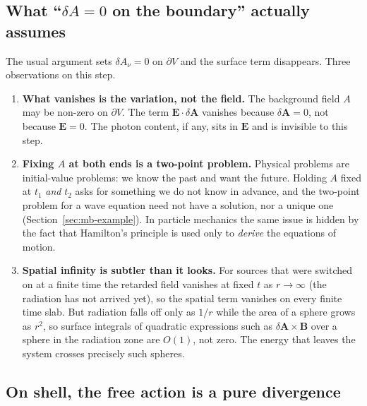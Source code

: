 \subsection{What ``$\delta A=0$ on the boundary'' actually assumes}

The usual argument sets $\delta A_\nu=0$ on $\partial V$ and the surface
term disappears. Three observations on this step.

\begin{enumerate}
\item \textbf{What vanishes is the variation, not the field.} The
background field $A$ may be non-zero on $\partial V$. The term
$\mathbf E\cdot\delta\mathbf A$ vanishes because $\delta\mathbf A=0$, not
because $\mathbf E=0$. The photon content, if any, sits in $\mathbf E$ and
is invisible to this step.

\item \textbf{Fixing $A$ at both ends is a two-point problem.} Physical
problems are initial-value problems: we know the past and want the future.
Holding $A$ fixed at $t_1$ \emph{and} $t_2$ asks for something we do not
know in advance, and the two-point problem for a wave equation need not
have a solution, nor a unique one (Section~\ref{sec:mb-example}). In
particle mechanics the same issue is hidden by the fact that Hamilton's
principle is used only to \emph{derive} the equations of motion.

\item \textbf{Spatial infinity is subtler than it looks.} For sources that
were switched on at a finite time the retarded field vanishes at fixed $t$
as $r\to\infty$ (the radiation has not arrived yet), so the spatial term
vanishes on every finite time slab. But radiation falls off only as $1/r$
while the area of a sphere grows as $r^2$, so surface integrals of
quadratic expressions such as $\delta\mathbf A\times\mathbf B$ over a
sphere in the radiation zone are $O(1)$, not zero. The energy that leaves
the system crosses precisely such spheres.
\end{enumerate}

\subsection{On shell, the free action is a pure divergence}

